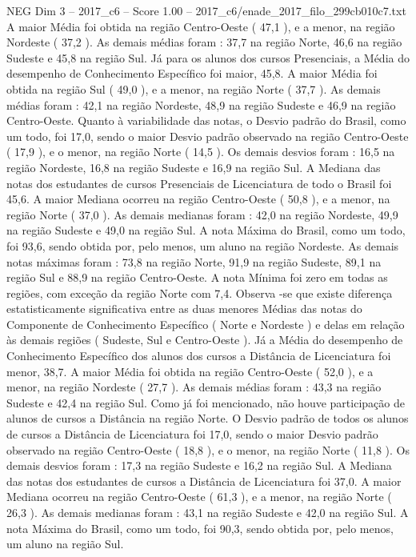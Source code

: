 \begin{textsample}{NEG Dim 3 – 2017\_c6 – Score 1.00 – 2017\_c6/enade\_2017\_filo\_299cb010c7.txt}
A maior Média foi obtida na região Centro-Oeste ( 47,1 ), e a menor, na região Nordeste ( 37,2 ).
As demais médias foram : 37,7 na região Norte, 46,6 na região Sudeste e 45,8 na região Sul.
Já para os alunos dos cursos Presenciais, a Média do desempenho de Conhecimento Específico foi maior, 45,8.
A maior Média foi obtida na região Sul ( 49,0 ), e a menor, na região Norte ( 37,7 ).
As demais médias foram : 42,1 na região Nordeste, 48,9 na região Sudeste e 46,9 na região Centro-Oeste.
Quanto à variabilidade das notas, o Desvio padrão do Brasil, como um todo, foi 17,0, sendo o maior Desvio padrão observado na região Centro-Oeste ( 17,9 ), e o menor, na região Norte ( 14,5 ).
Os demais desvios foram : 16,5 na região Nordeste, 16,8 na região Sudeste e 16,9 na região Sul.
A Mediana das notas dos estudantes de cursos Presenciais de Licenciatura de todo o Brasil foi 45,6.
A maior Mediana ocorreu na região Centro-Oeste ( 50,8 ), e a menor, na região Norte ( 37,0 ).
As demais medianas foram : 42,0 na região Nordeste, 49,9 na região Sudeste e 49,0 na região Sul.
A nota Máxima do Brasil, como um todo, foi 93,6, sendo obtida por, pelo menos, um aluno na região Nordeste.
As demais notas máximas foram : 73,8 na região Norte, 91,9 na região Sudeste, 89,1 na região Sul e 88,9 na região Centro-Oeste.
A nota Mínima foi zero em todas as regiões, com exceção da região Norte com 7,4.
Observa -se que existe diferença estatisticamente significativa entre as duas menores Médias das notas do Componente de Conhecimento Específico ( Norte e Nordeste ) e delas em relação às demais regiões ( Sudeste, Sul e Centro-Oeste ).
Já a Média do desempenho de Conhecimento Específico dos alunos dos cursos a Distância de Licenciatura foi menor, 38,7.
A maior Média foi obtida na região Centro-Oeste ( 52,0 ), e a menor, na região Nordeste ( 27,7 ).
As demais médias foram : 43,3 na região Sudeste e 42,4 na região Sul.
Como já foi mencionado, não houve participação de alunos de cursos a Distância na região Norte.
O Desvio padrão de todos os alunos de cursos a Distância de Licenciatura foi 17,0, sendo o maior Desvio padrão observado na região Centro-Oeste ( 18,8 ), e o menor, na região Norte ( 11,8 ).
Os demais desvios foram : 17,3 na região Sudeste e 16,2 na região Sul.
A Mediana das notas dos estudantes de cursos a Distância de Licenciatura foi 37,0.
A maior Mediana ocorreu na região Centro-Oeste ( 61,3 ), e a menor, na região Norte ( 26,3 ).
As demais medianas foram : 43,1 na região Sudeste e 42,0 na região Sul.
A nota Máxima do Brasil, como um todo, foi 90,3, sendo obtida por, pelo menos, um aluno na região Sul.

\end{textsample}
